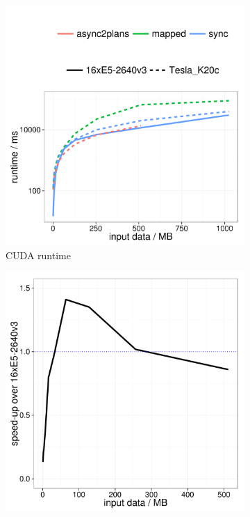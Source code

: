 \begin{figure}[h]
  \centering
  \hfill
  \begin{subfigure}[b]{0.45\textwidth}
    \includegraphics[width=\textwidth]{plots/batched_cgpu_runtime}
    \caption{CUDA runtime}
    \label{fig:batched_fft_runtime}
  \end{subfigure}%
  \hfill
  \begin{subfigure}[b]{0.45\textwidth}
    \includegraphics[width=\textwidth]{plots/batched_gpu_speed_up}

\end{subfigure}
\end{figure}
